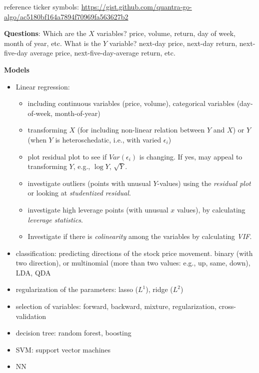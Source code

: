 \documentclass[
  letterpaper,
  DIV=11,
  numbers=noendperiod]{scrreprt}
\providecommand{\tightlist}{%
  \setlength{\itemsep}{0pt}\setlength{\parskip}{0pt}}\usepackage{longtable,booktabs,array}
\begin{document}
reference ticker symbols:
\url{https://gist.github.com/quantra-go-algo/ac5180bf164a7894f70969fa563627b2}

\textbf{Questions}: Which are the \(X\) variables? price, volume,
return, day of week, month of year, etc. What is the \(Y\) variable?
next-day price, next-day return, next-five-day average price,
next-five-day-average return, etc.

\textbf{Models}

\begin{itemize}
\item
  Linear regression:

  \begin{itemize}
  \tightlist
  \item
    including continuous variables (price, volume), categorical
    variables (day-of-week, month-of-year)
  \item
    transforming \(X\) (for including non-linear relation between \(Y\)
    and \(X\)) or \(Y\) (when \(Y\) is heteroschedatic, i.e., with
    varied \(\epsilon_i\))
  \item
    plot residual plot to see if \(Var(\epsilon_i)\) is changing. If
    yes, may appeal to transforming \(Y\), e.g., \(\log Y\),
    \(\sqrt{Y}\).
  \item
    investigate outliers (points with unusual \(Y\)-values) using the
    \emph{residual plot} or looking at \emph{studentized residual}.
  \item
    investigate high leverage points (with unusual \(x\) values), by
    calculating \emph{leverage statistics}.
  \item
    Investigate if there is \emph{colinearity} among the variables by
    calculating \emph{VIF}.
  \end{itemize}
\item
  classification: predicting directions of the stock price movement.
  binary (with two direction), or multinomial (more than two values:
  e.g., up, same, down), LDA, QDA
\item
  regularization of the parameters: lasso (\(L^1\)), ridge (\(L^2\))
\item
  selection of variables: forward, backward, mixture, regularization,
  cross-validation
\item
  decision tree: random forest, boosting
\item
  SVM: support vector machines
\item
  NN
\end{itemize}
\end{document}
